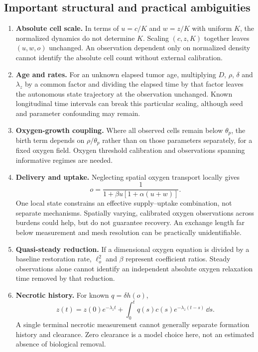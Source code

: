 \subsection{Important structural and practical ambiguities}
\begin{enumerate}
\item \textbf{Absolute cell scale.} In terms of $u=c/K$ and $w=z/K$ with uniform $K$, the normalized dynamics do not determine $K$. Scaling $(c,z,K)$ together leaves $(u,w,o)$ unchanged. An observation dependent only on normalized density cannot identify the absolute cell count without external calibration.
\item \textbf{Age and rates.} For an unknown elapsed tumor age, multiplying $D$, $\rho$, $\delta$ and $\lambda_z$ by a common factor and dividing the elapsed time by that factor leaves the autonomous state trajectory at the observation unchanged. Known longitudinal time intervals can break this particular scaling, although seed and parameter confounding may remain.
\item \textbf{Oxygen-growth coupling.} Where all observed cells remain below $\theta_p$, the birth term depends on $\rho/\theta_p$ rather than on those parameters separately, for a fixed oxygen field. Oxygen threshold calibration and observations spanning informative regimes are needed.
\item \textbf{Delivery and uptake.} Neglecting spatial oxygen transport locally gives
\begin{equation}
 o=\frac{1}{1+\beta u[1+\alpha(u+w)]}.
\end{equation}
One local state constrains an effective supply--uptake combination, not separate mechanisms. Spatially varying, calibrated oxygen observations across burdens could help, but do not guarantee recovery. An exchange length far below measurement and mesh resolution can be practically unidentifiable.
\item \textbf{Quasi-steady reduction.} If a dimensional oxygen equation is divided by a baseline restoration rate, $\ell_o^2$ and $\beta$ represent coefficient ratios. Steady observations alone cannot identify an independent absolute oxygen relaxation time removed by that reduction.
\item \textbf{Necrotic history.} For known $q=\delta h(o)$,
\begin{equation}
 z(t)=z(0)e^{-\lambda_z t}+\int_0^t q(s)c(s)e^{-\lambda_z(t-s)}\,\dd s .
\end{equation}
A single terminal necrotic measurement cannot generally separate formation history and clearance. Zero clearance is a model choice here, not an estimated absence of biological removal.
\end{enumerate}

